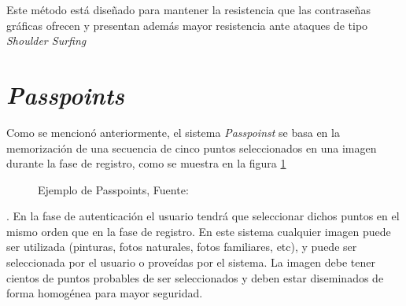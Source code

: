 Este método está diseñado para mantener la resistencia que las contraseñas gráficas ofrecen y presentan adem\'as mayor resistencia ante ataques de tipo \textit{Shoulder Surfing} 
 \cite{lashkari2009shoulder}






\section{\textit{Passpoints}}

Como se mencionó anteriormente, el sistema \textit{Passpoinst} \cite{wiedenbeck2005passpoints} se basa en la memorización de una secuencia de cinco puntos seleccionados en una imagen durante la fase de registro, como se muestra en la figura \ref{passpoints-example}

\begin{figure}[H]
	\centering
		\begin{minipage}[b]{0.7\linewidth}  %
		\centering
		\caption{Ejemplo de Passpoints, Fuente: \cite{wiedenbeck2005passpoints}}
		\label{passpoints-example}
	\end{minipage}%
	
\end{figure}
. En la fase de autenticación el usuario tendrá  que  seleccionar dichos puntos en el mismo orden que en la fase de registro. En  este  sistema  cualquier  imagen  puede  ser  utilizada  (pinturas,  fotos  naturales,  fotos  familiares,  etc),  y  puede  ser seleccionada  por  el  usuario  o proveídas por  el  sistema.  La  imagen  debe  tener  cientos  de  puntos  probables  de  ser seleccionados y deben estar diseminados de forma homogénea para mayor seguridad.
 
